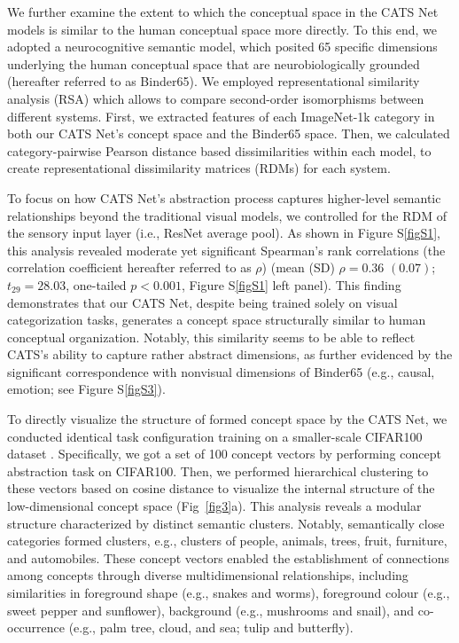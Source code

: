 \documentclass[pdflatex,sn-mathphys-num,lineno]{sn-jnl}%
\begin{document}
\begin{CJK}{UTF8}{gbsn}
We further examine the extent to which the conceptual space in the CATS Net models is similar to the human conceptual space more directly. To this end, we adopted a neurocognitive semantic model, which posited 65 specific dimensions underlying the human conceptual space that are neurobiologically grounded \cite{binder_toward_2016} (hereafter referred to as Binder65). We employed representational similarity analysis (RSA) \cite{kriegeskorte_representational_2008} which allows to compare second-order isomorphisms between different systems. First, we extracted features of each ImageNet-1k category in both our CATS Net's concept space and the Binder65 space. Then, we calculated category-pairwise Pearson distance based dissimilarities within each model, to create representational dissimilarity matrices (RDMs) for each system. 

To focus on how CATS Net's abstraction process captures higher-level semantic relationships beyond the traditional visual models, we controlled for the RDM of the sensory input layer (i.e., ResNet average pool). As shown in Figure S\ref{figS1}, this analysis revealed moderate yet significant Spearman’s rank correlations (the correlation coefficient hereafter referred to as $\rho$) (mean (SD) $\rho = 0.36$ $(0.07)$; $t_{29} = 28.03$, one-tailed $p < 0.001$, Figure S\ref{figS1} left panel). This finding demonstrates that our CATS Net, despite being trained solely on visual categorization tasks, generates a concept space structurally similar to human conceptual organization. Notably, this similarity seems to be able to reflect CATS’s ability to capture rather abstract dimensions, as further evidenced by the significant correspondence with nonvisual dimensions of Binder65 (e.g., causal, emotion; see Figure S\ref{figS3}).

To directly visualize the structure of formed concept space by the CATS Net, we conducted identical task configuration training on a smaller-scale CIFAR100 dataset \cite{krizhevsky_learning_2009}. Specifically, we got a set of 100 concept vectors by performing concept abstraction task on CIFAR100. Then, we performed hierarchical clustering to these vectors based on cosine distance to visualize the internal structure of the low-dimensional concept space (Fig~\ref{fig3}a). This analysis reveals a modular structure characterized by distinct semantic clusters. Notably, semantically close categories formed clusters, e.g., clusters of people, animals, trees, fruit, furniture, and automobiles. These concept vectors enabled the establishment of connections among concepts through diverse multidimensional relationships, including similarities in foreground shape (e.g., snakes and worms), foreground colour (e.g., sweet pepper and sunflower), background (e.g., mushrooms and snail), and co-occurrence (e.g., palm tree, cloud, and sea; tulip and butterfly).


\end{CJK}
\end{document}
